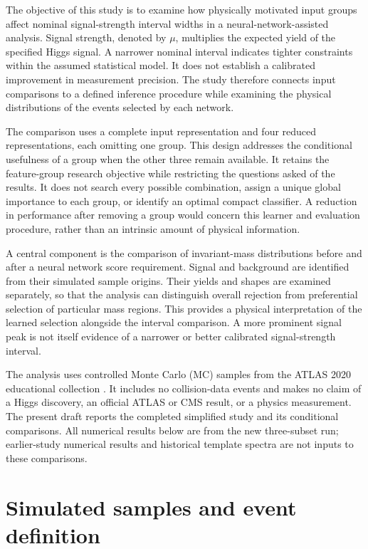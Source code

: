 \documentclass[aps,prd,reprint,superscriptaddress,nofootinbib,longbibliography,floatfix]{revtex4-2}
\begin{document}
The objective of this study is to examine how physically motivated input groups affect
nominal signal-strength interval widths in a neural-network-assisted analysis. Signal
strength, denoted by \(\mu\), multiplies the expected yield of the specified Higgs signal. A
narrower nominal interval indicates tighter constraints within the assumed statistical
model. It does not establish a calibrated improvement in measurement precision. The study
therefore connects input comparisons to a defined inference procedure while examining the
physical distributions of the events selected by each network.

The comparison uses a complete input representation and four reduced
representations, each omitting one group. This design addresses the conditional usefulness
of a group when the other three remain available. It retains the feature-group research
objective while restricting the questions asked of the results. It does not search every
possible combination, assign a unique global importance to each group, or identify an
optimal compact classifier. A reduction in performance after removing a group would concern
this learner and evaluation procedure, rather than an intrinsic amount of physical
information.

A central component is the comparison of invariant-mass distributions before and after a
neural network score requirement. Signal and background are identified from their simulated
sample origins. Their yields and shapes are examined separately, so that the analysis can
distinguish overall rejection from preferential selection of particular mass regions. This
provides a physical interpretation of the learned selection alongside the interval
comparison. A more prominent signal peak is not itself evidence of a narrower or better
calibrated signal-strength interval.

The analysis uses controlled Monte Carlo (MC) samples from the ATLAS 2020 educational
collection \cite{ATLAS2020}. It includes no collision-data events and makes no claim of a
Higgs discovery, an official ATLAS or CMS result, or a physics measurement. The present
draft reports the completed simplified study and its conditional comparisons. All
numerical results below are from the new three-subset run; earlier-study numerical
results and historical template spectra are not inputs to these comparisons.

\section{Simulated samples and event definition}
\end{document}
